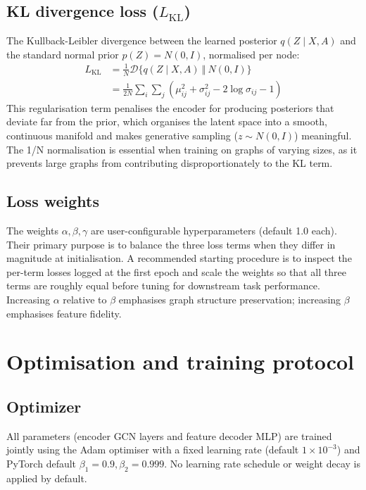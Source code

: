 \documentclass[11pt]{article}
\begin{document}
\subsection{KL divergence loss ($L_{\text{KL}}$)}
The Kullback-Leibler divergence between the learned posterior
$q(Z \mid X, A)$ and the standard normal prior $p(Z) = N(0, I)$,
normalised per node:
\begin{align*}
L_{\text{KL}}
&= \frac{1}{N} \mathcal{D}\big\{ q(Z \mid X, A) ~\Vert~ N(0, I) \big\}
\\
&= \frac{1}{2 N} \sum_i \sum_j ( \mu_{ij}^2 + \sigma_{ij}^2 - 2 \log
\sigma_{ij} - 1 )
\end{align*}
This regularisation term penalises the encoder for producing
posteriors that deviate far from the prior, which organises the
latent space into a smooth, continuous manifold and makes
generative sampling ($z \sim N(0, I)$) meaningful. The 1/N
normalisation is essential when training on graphs of varying
sizes, as it prevents large graphs from contributing
disproportionately to the KL term.

\subsection{Loss weights}
The weights $\alpha, \beta, \gamma$ are user-configurable
hyperparameters (default 1.0 each). Their primary purpose is to
balance the three loss terms when they differ in magnitude at
initialisation. A recommended starting procedure is to inspect the
per-term losses logged at the first epoch and scale the weights so
that all three terms are roughly equal before tuning for downstream
task performance. Increasing $\alpha$ relative to $\beta$ emphasises
graph structure preservation; increasing $\beta$ emphasises feature
fidelity.


\section{Optimisation and training protocol}

\subsection{Optimizer}
All parameters (encoder GCN layers and feature decoder MLP) are
trained jointly using the Adam optimiser with a fixed learning
rate (default $1 \times 10^{-3}$) and PyTorch default
$\beta_1 = 0.9, \beta_2 = 0.999$. No learning rate schedule or weight
decay is applied by default. 
\end{document}

